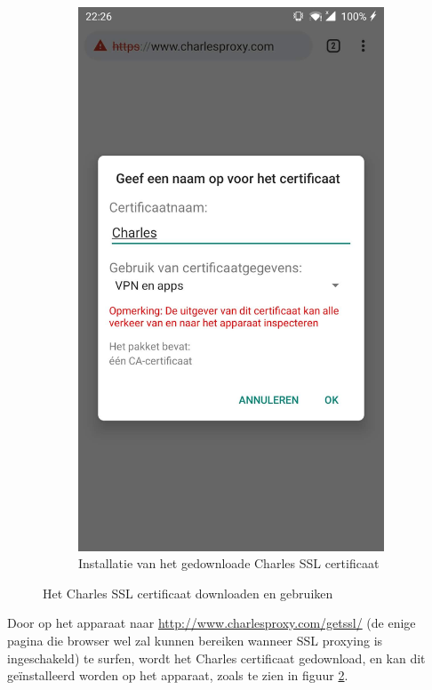 \begin{figure}
\begin{subfigure}{.5\textwidth}
        \includegraphics[width=0.8\linewidth]{img/charlessslcertificateinstall.jpg}
        \caption{Installatie van het gedownloade Charles SSL certificaat}
        \label{fig:charlessslcertificateinstall}
    \end{subfigure}
    \caption{Het Charles SSL certificaat downloaden en gebruiken}
\end{figure}

Door op het apparaat naar \url{http://www.charlesproxy.com/getssl/} (de enige pagina die browser wel zal kunnen bereiken wanneer SSL proxying is ingeschakeld) te surfen, wordt het Charles certificaat gedownload, en kan dit geïnstalleerd worden op het apparaat, zoals te zien in figuur \ref{fig:charlessslcertificateinstall}.

